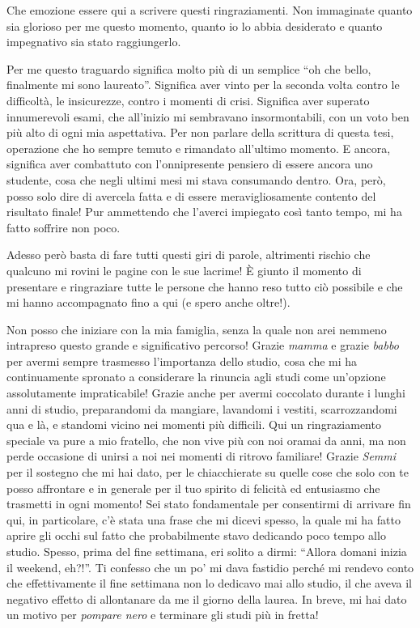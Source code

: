 \begin{acknowledgements}
  Che emozione essere qui a scrivere questi ringraziamenti.
  Non immaginate quanto sia glorioso per me questo momento, quanto io lo abbia desiderato e quanto impegnativo sia stato raggiungerlo.

  Per me questo traguardo significa molto più di un semplice ``oh che bello, finalmente mi sono laureato''.
  Significa aver vinto per la seconda volta contro le difficoltà, le insicurezze, contro i momenti di crisi.
  Significa aver superato innumerevoli esami, che all'inizio mi sembravano insormontabili, con un voto ben più alto di ogni mia aspettativa.
  Per non parlare della scrittura di questa tesi, operazione che ho sempre temuto e rimandato all'ultimo momento.
  E ancora, significa aver combattuto con l'onnipresente pensiero di essere ancora uno studente, cosa che negli ultimi mesi mi stava consumando dentro.
  Ora, però, posso solo dire di avercela fatta e di essere meravigliosamente contento del risultato finale!
  Pur ammettendo che l'averci impiegato così tanto tempo, mi ha fatto soffrire non poco.

  Adesso però basta di fare tutti questi giri di parole, altrimenti rischio che qualcuno mi rovini le pagine con le sue lacrime!
  È giunto il momento di presentare e ringraziare tutte le persone che hanno reso tutto ciò possibile e che mi hanno accompagnato fino a qui (e spero anche oltre!).

  Non posso che iniziare con la mia famiglia, senza la quale non arei nemmeno intrapreso questo grande  e significativo percorso! Grazie \emph{mamma} e grazie \emph{babbo} per avermi sempre trasmesso l'importanza dello studio, cosa che mi ha continuamente spronato a considerare la rinuncia agli studi come un'opzione assolutamente impraticabile! Grazie anche per avermi coccolato durante i lunghi anni di studio, preparandomi da mangiare, lavandomi i vestiti, scarrozzandomi qua e là, e standomi vicino nei momenti più difficili. Qui un ringraziamento speciale va pure a mio fratello, che non vive più con noi oramai da anni, ma non perde occasione di unirsi a noi nei momenti di ritrovo familiare! Grazie \emph{Semmi} per il sostegno che mi hai dato, per le chiacchierate su quelle cose che solo con te posso affrontare e in generale per il tuo spirito di felicità ed entusiasmo che trasmetti in ogni momento! Sei stato fondamentale per consentirmi di arrivare fin qui, in particolare, c'è stata una frase che mi dicevi spesso, la quale mi ha fatto aprire gli occhi sul fatto che probabilmente stavo dedicando poco tempo allo studio. Spesso, prima del fine settimana, eri solito a dirmi: ``Allora domani inizia il weekend, eh?!''. Ti confesso che un po' mi dava fastidio perché mi rendevo conto che effettivamente il fine settimana non lo dedicavo mai allo studio, il che aveva il negativo effetto di allontanare da me il giorno della laurea. In breve, mi hai dato un motivo per \textit{pompare nero} e terminare gli studi più in fretta!


\end{acknowledgements}
